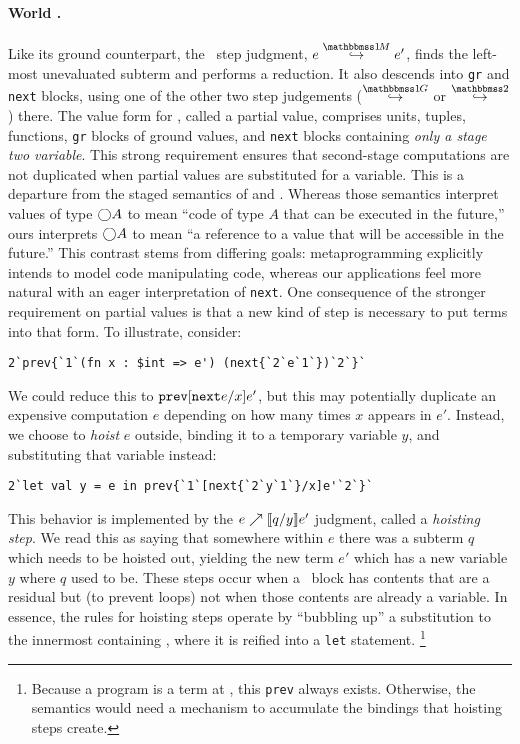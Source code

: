 \begin{abstrsyn}
\paragraph{World \bbonem.}
Like its ground counterpart, the \bbonem\ step judgment, $\stepmix e {e'}$, finds the left-most unevaluated subterm and performs a reduction.
It also descends into {\tt gr} and {\tt next} blocks, 
using one of the other two step judgements ($\stepsym \bbonep$ or $\stepsym \bbtwo$) there. 
The value form for \bbonem, called a partial value, comprises units, tuples, functions, {\tt gr} blocks of ground values, and {\tt next} blocks containing \emph{only a stage two variable}.
This strong requirement ensures that second-stage computations are not duplicated 
when partial values are substituted for a variable.
This is a departure from the staged semantics of \cite{taha-thesis-99} and \cite{davies96}.
Whereas those semantics interpret values of type $\bigcirc A$ to mean ``code of type $A$ that can be executed in the future,''
ours interprets $\bigcirc A$ to mean ``a reference to a value that will be accessible in the future.''
This contrast stems from differing goals: metaprogramming explicitly intends to model code manipulating code,
whereas our applications feel more natural with an eager interpretation of {\tt next}.
One consequence of the stronger requirement on partial values is that a new kind of step is necessary to put terms into that form.
To illustrate, consider:
\begin{lstlisting}
2`prev{`1`(fn x : $int => e') (next{`2`e`1`})`2`}`
\end{lstlisting}
We could reduce this to ${\tt prev}{[{\tt next} e/x]e'}$, but this may potentially duplicate an
expensive computation $e$ depending on how many times $x$ appears in $e'$. 
Instead, we choose to \emph{hoist} $e$ outside, binding it
to a temporary variable $y$, and substituting that variable instead:
\begin{lstlisting} 
2`let val y = e in prev{`1`[next{`2`y`1`}/x]e'`2`}`
\end{lstlisting}\end{abstrsyn}
This behavior is implemented by the ${e}\nearrow \llbracket q/y \rrbracket{e'}$ judgment, called a \emph{hoisting step}.
We read this as saying that somewhere within $e$ there was a subterm $q$ which needs to be hoisted out,
yielding the new term $e'$ which has a new variable $y$ where $q$ used to be.
These steps occur when a \next\ block has contents that are a residual but (to prevent loops) not when those contents are already a variable.
In essence, the rules for hoisting steps operate by ``bubbling up'' a substitution to the innermost containing \prev,
where it is reified into a {\tt let} statement.%
\footnote{Because a program is a term at \bbtwo, this {\tt prev} always exists.
Otherwise, the semantics would need a mechanism to accumulate the bindings that hoisting steps create.}

